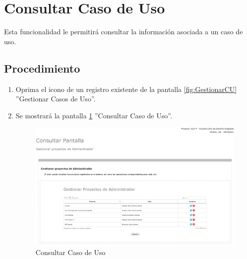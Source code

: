 \hypertarget{cv:consultarCU}{\section{Consultar Caso de Uso}} \label{sec:consultarCU}

	Esta funcionalidad le permitirá consultar la información asociada a un caso de uso.

		\subsection{Procedimiento}

			\begin{enumerate}
	
			\item Oprima el icono \IUConsultar{} de un registro existente de la pantalla \ref{fig:GestionarCU} ''Gestionar Casos de Uso''.
	
			\item Se mostrará la pantalla \ref{fig:consultarCUA} ''Consultar Caso de Uso''.
			
			\begin{figure}[htbp!]
				\begin{center}
					\includegraphics[scale=0.5]{roles/lider/casosUso/pantallas/IU11-4consultarPantallaA}
					\caption{Consultar Caso de Uso}
					\label{fig:consultarCUA}
				\end{center}
			\end{figure}
		

\end{enumerate}
